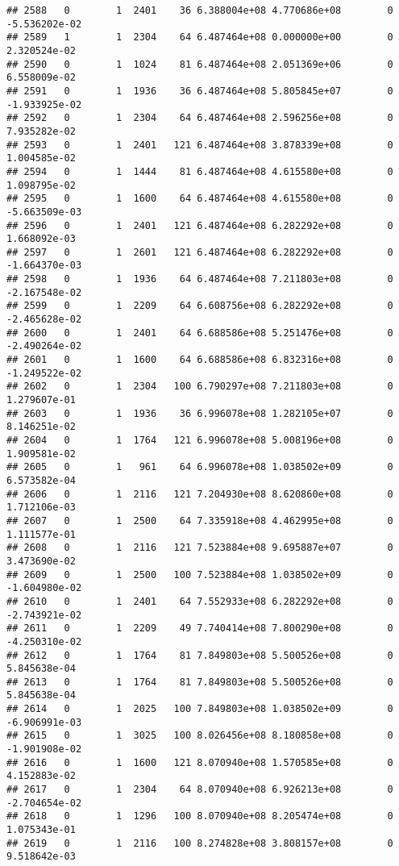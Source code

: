 \documentclass[
]{article}
\begin{document}
\begin{enumerate}
\begin{verbatim}
## 2588   0        1  2401    36 6.388004e+08 4.770686e+08        0 -5.536202e-02
## 2589   1        1  2304    64 6.487464e+08 0.000000e+00        0  2.320524e-02
## 2590   0        1  1024    81 6.487464e+08 2.051369e+06        0  6.558009e-02
## 2591   0        1  1936    36 6.487464e+08 5.805845e+07        0 -1.933925e-02
## 2592   0        1  2304    64 6.487464e+08 2.596256e+08        0  7.935282e-02
## 2593   0        1  2401   121 6.487464e+08 3.878339e+08        0  1.004585e-02
## 2594   0        1  1444    81 6.487464e+08 4.615580e+08        0  1.098795e-02
## 2595   0        1  1600    64 6.487464e+08 4.615580e+08        0 -5.663509e-03
## 2596   0        1  2401   121 6.487464e+08 6.282292e+08        0  1.668092e-03
## 2597   0        1  2601   121 6.487464e+08 6.282292e+08        0 -1.664370e-03
## 2598   0        1  1936    64 6.487464e+08 7.211803e+08        0 -2.167548e-02
## 2599   0        1  2209    64 6.608756e+08 6.282292e+08        0 -2.465628e-02
## 2600   0        1  2401    64 6.688586e+08 5.251476e+08        0 -2.490264e-02
## 2601   0        1  1600    64 6.688586e+08 6.832316e+08        0 -1.249522e-02
## 2602   0        1  2304   100 6.790297e+08 7.211803e+08        0  1.279607e-01
## 2603   0        1  1936    36 6.996078e+08 1.282105e+07        0  8.146251e-02
## 2604   0        1  1764   121 6.996078e+08 5.008196e+08        0  1.909581e-02
## 2605   0        1   961    64 6.996078e+08 1.038502e+09        0  6.573582e-04
## 2606   0        1  2116   121 7.204930e+08 8.620860e+08        0  1.712106e-03
## 2607   0        1  2500    64 7.335918e+08 4.462995e+08        0  1.111577e-01
## 2608   0        1  2116   121 7.523884e+08 9.695887e+07        0  3.473690e-02
## 2609   0        1  2500   100 7.523884e+08 1.038502e+09        0 -1.604980e-02
## 2610   0        1  2401    64 7.552933e+08 6.282292e+08        0 -2.743921e-02
## 2611   0        1  2209    49 7.740414e+08 7.800290e+08        0 -4.250310e-02
## 2612   0        1  1764    81 7.849803e+08 5.500526e+08        0  5.845638e-04
## 2613   0        1  1764    81 7.849803e+08 5.500526e+08        0  5.845638e-04
## 2614   0        1  2025   100 7.849803e+08 1.038502e+09        0 -6.906991e-03
## 2615   0        1  3025   100 8.026456e+08 8.180858e+08        0 -1.901908e-02
## 2616   0        1  1600   121 8.070940e+08 1.570585e+08        0  4.152883e-02
## 2617   0        1  2304    64 8.070940e+08 6.926213e+08        0 -2.704654e-02
## 2618   0        1  1296   100 8.070940e+08 8.205474e+08        0  1.075343e-01
## 2619   0        1  2116   100 8.274828e+08 3.808157e+08        0  9.518642e-03

\end{verbatim}
\end{enumerate}
\end{document}
